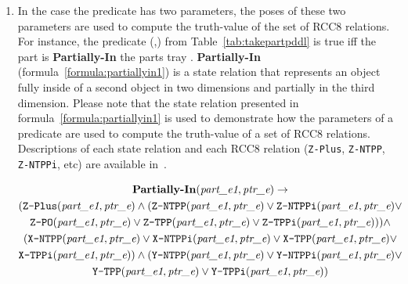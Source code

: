 \begin{enumerate}
\item In the case the predicate has two parameters, the poses of these two parameters are used to compute the truth-value of the set of RCC8 relations. For instance, the predicate (,) from Table~\ref{tab:takepartpddl} is true iff the part  is \textbf{Partially-In} the parts tray .  \textbf{Partially-In} (formula~\ref{formula:partiallyin1}) is a state relation that represents an object fully inside of a second object in two dimensions and partially in the third dimension. Please note that the state relation presented in formula~\ref{formula:partiallyin1} is used to demonstrate how the parameters of a predicate are used to compute the truth-value of a set of RCC8 relations. Descriptions of each state relation and each RCC8 relation (\texttt{Z-Plus}, \texttt{Z-NTPP}, \texttt{Z-NTPPi}, etc) are available in~\cite{SCHLENOFF.RAS.2013}.


\begin{gather}
\label{formula:partiallyin1}
\textbf{Partially-In}(\textit{part\_e1}, \textit{ptr\_e}) \rightarrow   \\
(\texttt{Z-Plus}(\textit{part\_e1}, \textit{ptr\_e}) \wedge (\texttt{Z-NTPP}(\textit{part\_e1}, \textit{ptr\_e}) \vee \texttt{Z-NTPPi}(\textit{part\_e1}, \textit{ptr\_e}) \vee  \notag\\\texttt{Z-PO}(\textit{part\_e1}, \textit{ptr\_e}) \vee \texttt{Z-TPP}(\textit{part\_e1}, \textit{ptr\_e}) \vee \texttt{Z-TPPi}(\textit{part\_e1}, \textit{ptr\_e}))) \wedge \notag\\
(\texttt{X-NTPP}(\textit{part\_e1}, \textit{ptr\_e}) \vee \texttt{X-NTPPi}(\textit{part\_e1}, \textit{ptr\_e}) \vee \texttt{X-TPP}(\textit{part\_e1}, \textit{ptr\_e}) \vee  \notag\\ \texttt{X-TPPi}(\textit{part\_e1}, \textit{ptr\_e}))\wedge
(\texttt{Y-NTPP}(\textit{part\_e1}, \textit{ptr\_e}) \vee \texttt{Y-NTPPi}(\textit{part\_e1}, \textit{ptr\_e}) \vee  \notag\\ \texttt{Y-TPP}(\textit{part\_e1}, \textit{ptr\_e}) \vee \texttt{Y-TPPi}(\textit{part\_e1}, \textit{ptr\_e})) \notag
\end{gather}


\end{enumerate}
